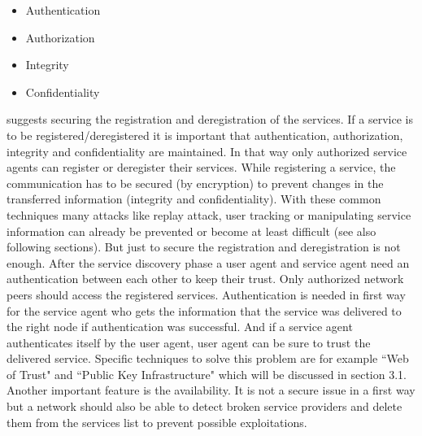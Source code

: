 \begin{itemize}
\item Authentication 
\item Authorization 
\item Integrity 
\item Confidentiality 
\end{itemize}
\citet{Cotroneo2004} suggests securing the registration and deregistration of the services. If a service is to be registered/deregistered it is important that authentication, authorization, integrity and confidentiality are maintained. In that way only authorized service agents can register or deregister their services. While registering a service, the communication has to be secured (by encryption) to prevent changes in the transferred information (integrity and confidentiality). With these common techniques many attacks like replay attack, user tracking or manipulating service information can already be prevented or become at least difficult (see also following sections). But just to secure the registration and deregistration is not enough. After the service discovery phase a user agent and service agent need an authentication between each other to keep their trust. Only authorized network peers should access the registered services. Authentication is needed in first way for the service agent who gets the information that the service was delivered to the right node if authentication was successful. And if a service agent authenticates itself by the user agent, user agent can be sure to trust the delivered service. Specific techniques to solve this problem are for example ``Web of Trust" and ``Public Key Infrastructure" which will be discussed in section 3.1.\\
Another important feature is the availability. It is not a secure issue in a first way but a network should also be able to detect broken service providers and delete them from the services list to prevent possible exploitations.